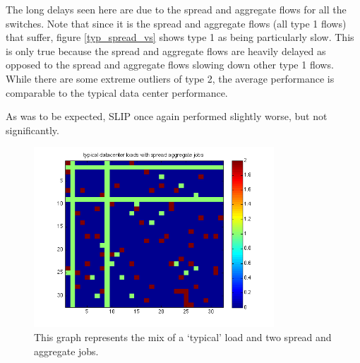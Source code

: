 \documentclass[11pt]{article}%
\begin{document}
The long delays seen here are due to the spread and aggregate flows for all the switches.  Note that since it is the spread and aggregate flows (all type 1 flows) that suffer, figure \ref{typ_spread_vs} shows type 1 as being particularly slow.  This is only true because the spread and aggregate flows are heavily delayed as opposed to the spread and aggregate flows slowing down other type 1 flows.  While there are some extreme outliers of type 2, the average performance is comparable to the typical data center performance.

As was to be expected, SLIP once again performed slightly worse, but not significantly.
\begin{figure}%
\center
	 \includegraphics[width=90mm]{typ_spread_flows.png}
	\caption{This graph represents the mix of a `typical' load and two spread and aggregate jobs.}
	\label{typ_spread_flows}
\end{figure}

%
\end{document}
